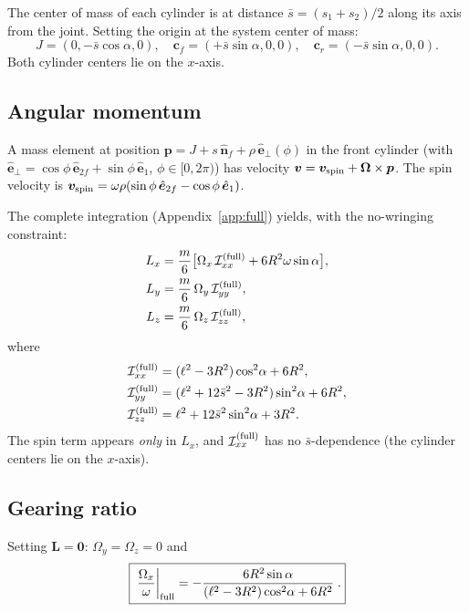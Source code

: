 \documentclass[11pt]{article}
\newcommand{\vect}[1]{\bm{#1}}
\newcommand{\uv}[1]{\hat{\bm{#1}}}
\newcommand{\nf}{\uv{n}_{\!f}}
\begin{document}
The center of mass of each cylinder is at distance
$\bar{s}=(s_1+s_2)/2$ along its axis from the joint.  Setting the
origin at the system center of mass:
\begin{equation}\label{eq:full_com}
J = (0,-\bar{s}\cos\alpha,0),\quad
\vect{c}_f = (+\bar{s}\sin\alpha,0,0),\quad
\vect{c}_r = (-\bar{s}\sin\alpha,0,0).
\end{equation}
Both cylinder centers lie on the $x$-axis.

\subsection{Angular momentum}

A mass element at position
$\vect{p}=J+s\,\nf+\rho\,\uv{e}_\perp(\phi)$ in the front cylinder
(with $\uv{e}_\perp=\cos\phi\,\uv{e}_{2f}+\sin\phi\,\uv{e}_1$,
$\phi\in[0,2\pi)$) has velocity
$\vect{v}=\vect{v}_{\rm spin}+\vect{\Omega}\times\vect{p}$.  The
spin velocity is
$\vect{v}_{\rm spin}=\omega\rho(\sin\phi\,\uv{e}_{2f}-\cos\phi\,\uv{e}_1)$.

The complete integration (Appendix~\ref{app:full}) yields, with the
no-wringing constraint:
\begin{align}
L_x &= \frac{m}{6}\bigl[
  \Omega_x\,\mathcal{I}_{xx}^{(\rm full)}
  + 6R^2\omega\sin\alpha\bigr], \label{eq:Lx_full}\\
L_y &= \frac{m}{6}\,\Omega_y\,\mathcal{I}_{yy}^{(\rm full)},
  \label{eq:Ly_full}\\
L_z &= \frac{m}{6}\,\Omega_z\,\mathcal{I}_{zz}^{(\rm full)},
  \label{eq:Lz_full}
\end{align}
where
\begin{align}
\mathcal{I}_{xx}^{(\rm full)} &= (\ell^2-3R^2)\cos^2\!\alpha+6R^2, \label{eq:Ixx_full}\\
\mathcal{I}_{yy}^{(\rm full)} &= (\ell^2+12\bar{s}^2-3R^2)\sin^2\!\alpha+6R^2, \label{eq:Iyy_full}\\
\mathcal{I}_{zz}^{(\rm full)} &= \ell^2+12\bar{s}^2\sin^2\!\alpha+3R^2. \label{eq:Izz_full}
\end{align}
The spin term appears \emph{only} in $L_x$, and
$\mathcal{I}_{xx}^{(\rm full)}$ has no $\bar{s}$-dependence (the
cylinder centers lie on the $x$-axis).

\subsection{Gearing ratio}

Setting $\vect{L}=\vect{0}$: $\Omega_y=\Omega_z=0$ and
\begin{equation}\label{eq:gear_full}
\boxed{\;
\frac{\Omega_x}{\omega}\bigg|_{\rm full}
= -\frac{6R^2\sin\alpha}
  {(\ell^2-3R^2)\cos^2\!\alpha+6R^2}\;.}
\end{equation}
\end{document}
